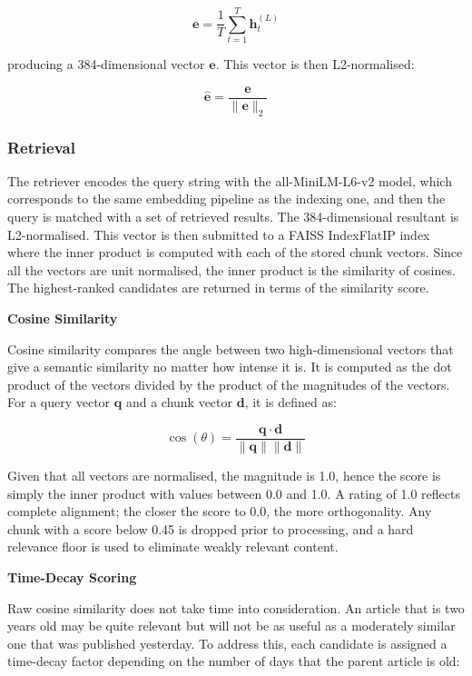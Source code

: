 \begin{equation}
    \mathbf{e} = \frac{1}{T} \sum_{t=1}^{T} \mathbf{h}_t^{(L)}
\end{equation}

producing a 384-dimensional vector $\mathbf{e}$. This vector is then L2-normalised:

\begin{equation}
    \hat{\mathbf{e}} = \frac{\mathbf{e}}{\|\mathbf{e}\|_2}
\end{equation}


\subsubsection{Retrieval}

The retriever encodes the query string with the all-MiniLM-L6-v2 model, which corresponds to the same embedding pipeline as the indexing one, and then the query is matched with a set of retrieved results. The 384-dimensional resultant is L2-normalised. This vector is then submitted to a FAISS IndexFlatIP index where the inner product is computed with each of the stored chunk vectors. Since all the vectors are unit normalised, the inner product is the similarity of cosines. The highest-ranked candidates are returned in terms of the similarity score.

\textbf{Cosine Similarity}

Cosine similarity compares the angle between two high-dimensional vectors that give a semantic similarity no matter how intense it is. It is computed as the dot product of the vectors divided by the product of the magnitudes of the vectors. For a query vector $\mathbf{q}$ and a chunk vector $\mathbf{d}$, it is defined as:

\begin{equation}
    \cos(\theta) = \frac{\mathbf{q} \cdot \mathbf{d}}{\|\mathbf{q}\| \|\mathbf{d}\|}
\end{equation}

Given that all vectors are normalised, the magnitude is 1.0, hence the score is simply the inner product with values between 0.0 and 1.0. A rating of 1.0 reflects complete alignment; the closer the score to 0.0, the more orthogonality. Any chunk with a score below 0.45 is dropped prior to processing, and a hard relevance floor is used to eliminate weakly relevant content.

\textbf{Time-Decay Scoring}

Raw cosine similarity does not take time into consideration. An article that is two years old may be quite relevant but will not be as useful as a moderately similar one that was published yesterday. To address this, each candidate is assigned a time-decay factor depending on the number of days that the parent article is old:

